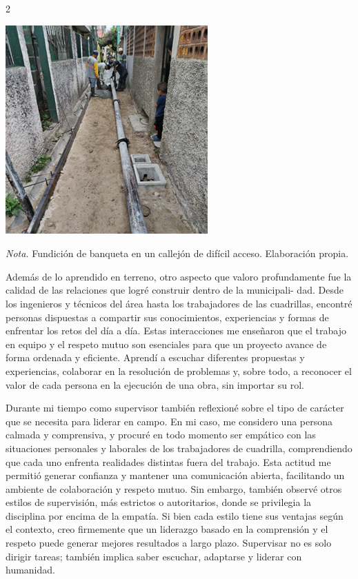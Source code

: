 \documentclass[12pt,spanish,Letterpaper,openany]{book}
\begin{document}
\begin {multicols}{2}
\begin {flushleft}
\begin{minipage}[c]{\columnwidth}
\begin{center}\includegraphics[width=0.8\linewidth]{imagenes_articulos/art04_02} \end{center}

\emph{Nota.} Fundición de banqueta en un callejón de difícil acceso. Elaboración propia.

\end{minipage}
\end {flushleft}

Además de lo aprendido en terreno, otro aspecto que valoro profundamente fue la calidad de las relaciones que logré construir dentro de la municipali-
dad. Desde los ingenieros y técnicos del área hasta los trabajadores de las cuadrillas, encontré personas dispuestas a compartir sus conocimientos, experiencias y formas de enfrentar los retos del día a día. Estas interacciones me enseñaron que el trabajo en equipo y el respeto mutuo son esenciales para que un proyecto avance de forma ordenada y eficiente. Aprendí a escuchar diferentes propuestas y experiencias, colaborar en la resolución de problemas y, sobre todo, a reconocer el valor de cada persona en la ejecución de una obra, sin importar su rol.

Durante mi tiempo como supervisor también reflexioné sobre el tipo de carácter que se necesita para liderar en campo. En mi caso, me considero una persona calmada y comprensiva, y procuré en todo momento ser empático con las situaciones personales y laborales de los trabajadores de cuadrilla, comprendiendo que cada uno enfrenta realidades distintas fuera del trabajo. Esta actitud me permitió generar confianza y mantener una comunicación abierta, facilitando un ambiente de colaboración y respeto mutuo. Sin embargo, también observé otros estilos de supervisión, más estrictos o autoritarios, donde se privilegia la disciplina por encima de la empatía. Si bien cada estilo tiene sus ventajas según el contexto, creo firmemente que un liderazgo basado en la comprensión y el respeto puede generar mejores resultados a largo plazo. Supervisar no es solo dirigir tareas; también implica saber escuchar, adaptarse y liderar con humanidad.


\end{multicols}
\end{document}
